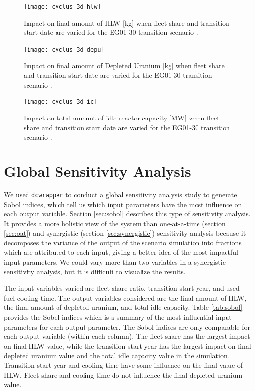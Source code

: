 \begin{figure}[]
    \centering
    \texttt{[image: cyclus\_3d\_hlw]} 
    \caption{Impact on final amount of HLW [kg] when fleet share and transition start date are varied for the \Cyclus EG01-30 transition scenario \cite{chee_arfc/dcwrapper_2019}.}
    \label{fig:cyclus_3d_hlw}
\end{figure}

\begin{figure}[]
    \centering
    \texttt{[image: cyclus\_3d\_depu]} 
    \caption{Impact on final amount of Depleted Uranium [kg] when fleet share and transition start date are varied for the \Cyclus EG01-30 transition scenario \cite{chee_arfc/dcwrapper_2019}.}
    \label{fig:cyclus_3d_depu}
\end{figure}

\begin{figure}[]
    \centering
    \texttt{[image: cyclus\_3d\_ic]} 
    \caption{Impact on total amount of idle reactor capacity [MW] when fleet share and transition start date are varied for the \Cyclus EG01-30 transition scenario \cite{chee_arfc/dcwrapper_2019}.}
    \label{fig:cyclus_3d_ic}
\end{figure}

\section{Global Sensitivity Analysis}
We used \texttt{dcwrapper} to conduct a global sensitivity 
analysis study to generate Sobol indices, which tell us which 
input parameters have the most influence on each output variable.
Section \ref{sec:sobol} describes this type of sensitivity 
analysis.
It provides a more holistic view of the system 
than one-at-a-time (section \ref{sec:oat}) and 
synergistic (section \ref{sec:synergistic}) sensitivity 
analysis because it decomposes the variance of the 
output of the scenario simulation into fractions which are 
attributed to each input, giving a better idea of the
most impactful input parameters. 
We could vary more than two variables in a synergistic 
sensitivity analysis, but it is difficult to visualize the results.

The input variables varied are fleet share ratio, 
transition start year, and used fuel cooling time.
The output variables considered are the final amount of HLW, 
the final amount of depleted uranium, and total idle capacity. 
Table \ref{tab:sobol} provides the Sobol indices which is 
a summary of the most influential input parameters 
for each output parameter. 
The Sobol indices are only comparable for each output variable 
(within each column). 
The fleet share has the largest impact on 
final HLW value, while the transition start year has the largest 
impact on final depleted uranium value and the total idle 
capacity value in the simulation. 
Transition start year and cooling time have some influence on 
the final value of HLW. 
Fleet share and cooling time do not influence the final 
depleted uranium value. 
    
